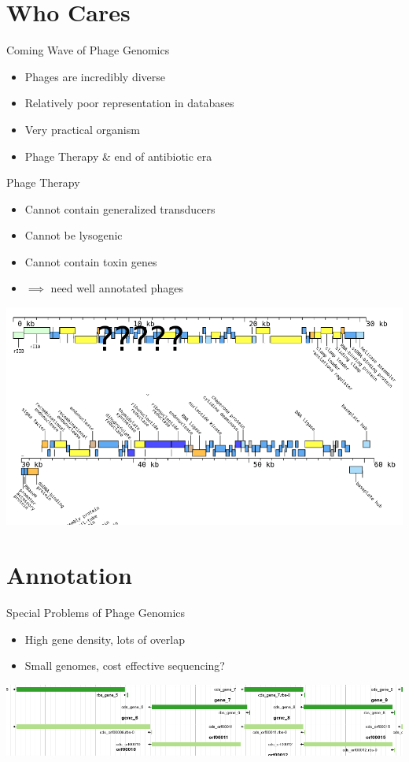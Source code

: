 \documentclass[12pt]{beamer}
\begin{document}
\section{Who Cares}
\begin{frame}{Coming Wave of Phage Genomics}
    \begin{itemize}
        \item Phages are incredibly diverse
        \item Relatively poor representation in databases
        \item Very practical organism
        \item Phage Therapy \& end of antibiotic era
    \end{itemize}
\end{frame}
\begin{frame}{Phage Therapy}
    \begin{itemize}
        \item Cannot contain generalized transducers
        \item Cannot be lysogenic
        \item Cannot contain toxin genes
        \item $\implies$ need well annotated phages
    \end{itemize}
    \centering
    \includegraphics[height=.5\textheight]{./therapy.png}
\end{frame}

\section{Annotation}
\begin{frame}{Special Problems of Phage Genomics}
    \begin{itemize}
        \item High gene density, lots of overlap
        \item Small genomes, cost effective sequencing?
    \end{itemize}
    \centering
    \includegraphics[width=\textwidth]{./overlap.png}
\end{frame}
\end{document}
